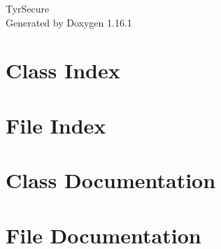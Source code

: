 \documentclass[twoside]{book}
\newcommand{\+}{\discretionary{\mbox{\scriptsize$\hookleftarrow$}}{}{}}
\newcommand{\clearemptydoublepage}{%
    \newpage{\pagestyle{empty}\cleardoublepage}%
  }
\begin{document}
  \raggedbottom
    \hypersetup{pageanchor=false,
                bookmarksnumbered=true,
                pdfencoding=unicode
               }
  \begin{titlepage}
  \vspace*{7cm}
  \begin{center}%
  {\Large Tyr\+Secure}\\
  \vspace*{1cm}
  {\large Generated by Doxygen 1.16.1}\\
  \end{center}
  \end{titlepage}
  \clearemptydoublepage
  \tableofcontents
  \clearemptydoublepage
  \hypersetup{pageanchor=true}

\chapter{Class Index}

\chapter{File Index}

\chapter{Class Documentation}






\chapter{File Documentation}







  \backmatter
  \newpage
  \clearemptydoublepage
  \printindex
\end{document}
